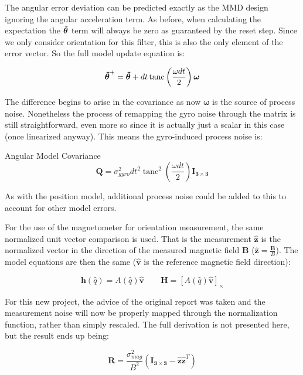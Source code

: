 \documentclass{article}
\DeclareMathOperator{\tanc}{tanc}
\renewcommand{\vec}{\boldsymbol} %
\newcommand{\mat}{\vec}
\newcommand{\uvec}[1]{\vec{\hat{#1}}}
\begin{document}
	The angular error deviation can be predicted exactly as the MMD design ignoring the angular acceleration term.  As before, when calculating the expectation the $\aerr$ term will always be zero as guaranteed by the reset step.  Since we only consider orientation for this filter, this is also the only element of the error vector.  So the full model update equation is:
	
	\begin{equation}
		\aerr^+ = \aerr + dt\tanc\left(\frac{\omega dt}{2}\right)\vec{\omega}
	\end{equation}
	
	The difference begins to arise in the covariance as now $\vec{\omega}$ is the source of process noise.  Nonetheless the process of remapping the gyro noise through the matrix is still straightforward, even more so since it is actually just a scalar in this case (once linearized anyway).  This means the gyro-induced process noise is:
	
	Angular Model Covariance
	\begin{equation}
		\mat{Q} = \sigma_{gyro}^2 dt^2\tanc^2\left(\frac{\omega dt}{2}\right) \mat{I_{3\times3}}
	\end{equation}
	
	As with the position model, additional process noise could be added to this to account for other model errors.
	
	For the use of the magnetometer for orientation measurement, the same normalized unit vector comparison is used.  That is the measurement $\uvec{z}$ is the normalized vector in the direction of the measured magnetic field $\vec{B}$ ($\uvec{z} = \frac{\vec{B}}{B}$).  The model equations are then the same ($\uvec{v}$ is the reference magnetic field direction):
	
	\begin{equation}
		\vec{h}(\hat{q}) = A(\hat{q})\uvec{v}\qquad\mat{H} = [A(\hat{q})\uvec{v}]_\times
	\end{equation}
	
	For this new project, the advice of the original report was taken and the measurement noise will now be properly mapped through the normalization function, rather than simply rescaled.  The full derivation is not presented here, but the result ends up being:	
	
	\begin{equation}
		\mat{R} = \frac{\sigma_{mag}^2}{B^2}\left(\mat{I_{3\times 3}} - \uvec{z}\uvec{z}^T\right)
	\end{equation}
	
\end{document}
